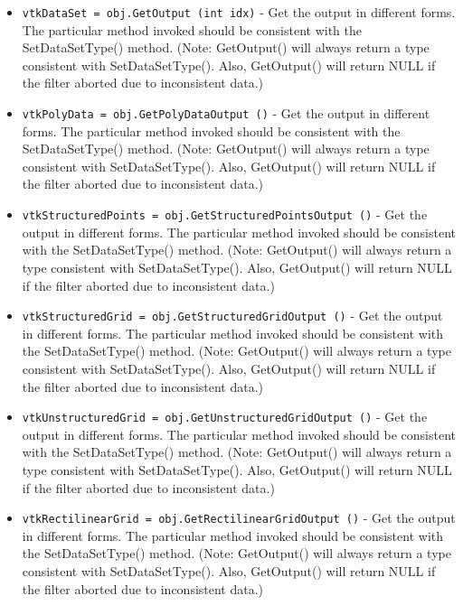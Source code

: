 \begin{itemize}
\item  \verb|vtkDataSet = obj.GetOutput (int idx)| -  Get the output in different forms. The particular method invoked
 should be consistent with the SetDataSetType() method. (Note:
 GetOutput() will always return a type consistent with 
 SetDataSetType(). Also, GetOutput() will return NULL if the filter
 aborted due to inconsistent data.)

\item  \verb|vtkPolyData = obj.GetPolyDataOutput ()| -  Get the output in different forms. The particular method invoked
 should be consistent with the SetDataSetType() method. (Note:
 GetOutput() will always return a type consistent with 
 SetDataSetType(). Also, GetOutput() will return NULL if the filter
 aborted due to inconsistent data.)

\item  \verb|vtkStructuredPoints = obj.GetStructuredPointsOutput ()| -  Get the output in different forms. The particular method invoked
 should be consistent with the SetDataSetType() method. (Note:
 GetOutput() will always return a type consistent with 
 SetDataSetType(). Also, GetOutput() will return NULL if the filter
 aborted due to inconsistent data.)

\item  \verb|vtkStructuredGrid = obj.GetStructuredGridOutput ()| -  Get the output in different forms. The particular method invoked
 should be consistent with the SetDataSetType() method. (Note:
 GetOutput() will always return a type consistent with 
 SetDataSetType(). Also, GetOutput() will return NULL if the filter
 aborted due to inconsistent data.)

\item  \verb|vtkUnstructuredGrid = obj.GetUnstructuredGridOutput ()| -  Get the output in different forms. The particular method invoked
 should be consistent with the SetDataSetType() method. (Note:
 GetOutput() will always return a type consistent with 
 SetDataSetType(). Also, GetOutput() will return NULL if the filter
 aborted due to inconsistent data.)

\item  \verb|vtkRectilinearGrid = obj.GetRectilinearGridOutput ()| -  Get the output in different forms. The particular method invoked
 should be consistent with the SetDataSetType() method. (Note:
 GetOutput() will always return a type consistent with 
 SetDataSetType(). Also, GetOutput() will return NULL if the filter
 aborted due to inconsistent data.)


\end{itemize}
